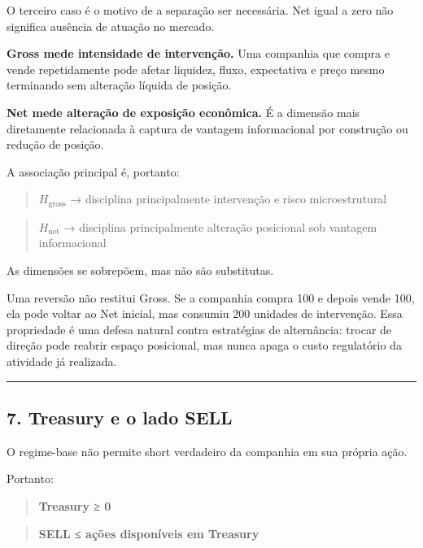 \documentclass[
  a4paper,
]{article}
\begin{document}
O terceiro caso é o motivo de a separação ser necessária. Net igual a
zero não significa ausência de atuação no mercado.

\textbf{Gross mede intensidade de intervenção.} Uma companhia que compra
e vende repetidamente pode afetar liquidez, fluxo, expectativa e preço
mesmo terminando sem alteração líquida de posição.

\textbf{Net mede alteração de exposição econômica.} É a dimensão mais
diretamente relacionada à captura de vantagem informacional por
construção ou redução de posição.

A associação principal é, portanto:

\begin{quote}
\(H_{\mathrm{gross}}\) → disciplina principalmente intervenção e risco
microestrutural
\end{quote}

\begin{quote}
\(H_{\mathrm{net}}\) → disciplina principalmente alteração posicional
sob vantagem informacional
\end{quote}

As dimensões se sobrepõem, mas não são substitutas.

Uma reversão não restitui Gross. Se a companhia compra 100 e depois
vende 100, ela pode voltar ao Net inicial, mas consumiu 200 unidades de
intervenção. Essa propriedade é uma defesa natural contra estratégias de
alternância: trocar de direção pode reabrir espaço posicional, mas nunca
apaga o custo regulatório da atividade já realizada.

\begin{center}\rule{0.5\linewidth}{0.5pt}\end{center}

\hypertarget{7-treasury-e-o-lado-sell}{}

\hypertarget{7-treasury-e-o-lado-sell}{%
\subsection{7. Treasury e o lado SELL}\label{7-treasury-e-o-lado-sell}}

O regime-base não permite short verdadeiro da companhia em sua própria
ação.

Portanto:

\begin{quote}
\textbf{Treasury ≥ 0}
\end{quote}

\begin{quote}
\textbf{SELL ≤ ações disponíveis em Treasury}
\end{quote}
\end{document}
